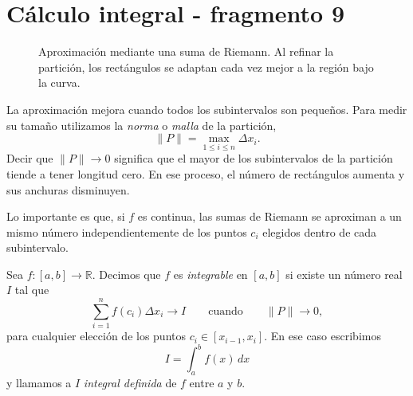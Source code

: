 \section{Cálculo integral - fragmento 9}
\begin{figure}[htbp]
\centering
{}
\caption{Aproximación mediante una suma de Riemann. Al refinar la partición, los rectángulos se adaptan cada vez mejor a la región bajo la curva.}

\end{figure}

La aproximación mejora cuando todos los subintervalos son pequeños. Para medir su tamaño utilizamos la \emph{norma} o \emph{malla} de la partición,
\[
\|P\|=\max_{1\leq i\leq n}\Delta x_i.
\]
Decir que $\|P\|\to0$ significa que el mayor de los subintervalos de la partición tiende a tener longitud cero. En ese proceso, el número de rectángulos aumenta y sus anchuras disminuyen.

Lo importante es que, si $f$ es continua, las sumas de Riemann se aproximan a un mismo número independientemente de los puntos $c_i$ elegidos dentro de cada subintervalo.

\begin{definition}
Sea $f:[a,b]\to\mathbb{R}$. Decimos que $f$ es \emph{integrable} en $[a,b]$ si existe un número real $I$ tal que
\[
\sum_{i=1}^{n}f(c_i)\Delta x_i\longrightarrow I
\qquad\text{cuando}\qquad
\|P\|\longrightarrow0,
\]
para cualquier elección de los puntos $c_i\in[x_{i-1},x_i]$. En ese caso escribimos
\[
\boxed{I=\int_a^b f(x)\,dx}
\]
y llamamos a $I$ \emph{integral definida} de $f$ entre $a$ y $b$.
\end{definition}


